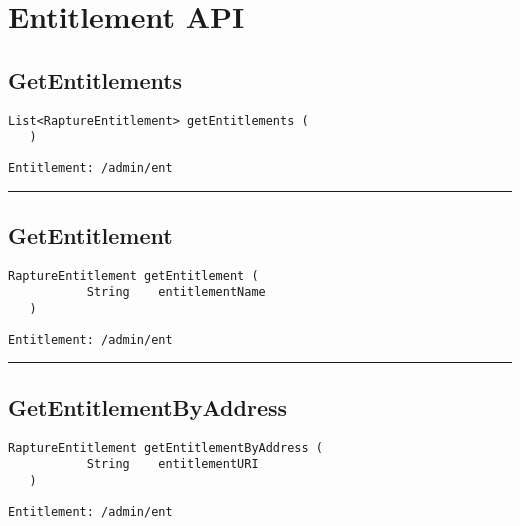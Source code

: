 \chapter{Entitlement API}

\section{GetEntitlements}
\label{Api:GetEntitlements}
\begin{lstlisting}[style=nonumbers]
   List<RaptureEntitlement> getEntitlements (
   )
\end{lstlisting}
\begin{Verbatim}[formatcom=\color{Maroon}]
  Entitlement: /admin/ent
\end{Verbatim}



\rule{12cm}{2pt}
\section{GetEntitlement}
\label{Api:GetEntitlement}
\begin{lstlisting}[style=nonumbers]
   RaptureEntitlement getEntitlement (
           String    entitlementName
   )
\end{lstlisting}
\begin{Verbatim}[formatcom=\color{Maroon}]
  Entitlement: /admin/ent
\end{Verbatim}



\rule{12cm}{2pt}
\section{GetEntitlementByAddress}
\label{Api:GetEntitlementByAddress}
\begin{lstlisting}[style=nonumbers]
   RaptureEntitlement getEntitlementByAddress (
           String    entitlementURI
   )
\end{lstlisting}
\begin{Verbatim}[formatcom=\color{Maroon}]
  Entitlement: /admin/ent
\end{Verbatim}



